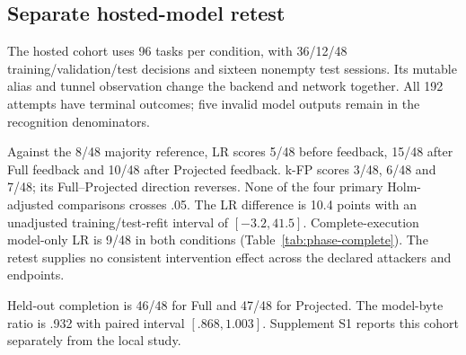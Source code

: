 \subsection{Separate hosted-model retest}
The hosted cohort uses 96 tasks per condition, with 36/12/48 training/validation/test decisions and sixteen nonempty test sessions. Its mutable alias and tunnel observation change the backend and network together. All 192 attempts have terminal outcomes; five invalid model outputs remain in the recognition denominators.

Against the 8/48 majority reference, LR scores 5/48 before feedback, 15/48 after Full feedback and 10/48 after Projected feedback. k-FP scores 3/48, 6/48 and 7/48; its Full--Projected direction reverses. None of the four primary Holm-adjusted comparisons crosses .05. The LR difference is 10.4 points with an unadjusted training/test-refit interval of $[-3.2,41.5]$. Complete-execution model-only LR is 9/48 in both conditions (Table~\ref{tab:phase-complete}). The retest supplies no consistent intervention effect across the declared attackers and endpoints.

Held-out completion is 46/48 for Full and 47/48 for Projected. The model-byte ratio is .932 with paired interval $[.868,1.003]$. Supplement S1 reports this cohort separately from the local study.
